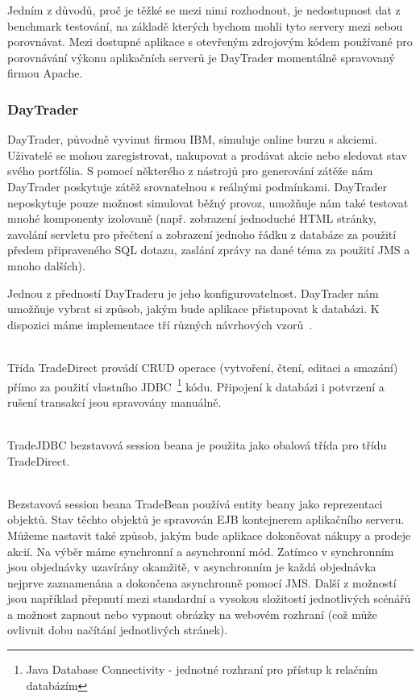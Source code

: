 \documentclass[122pt,oneside]{fithesis}
\begin{document}
Jedním z důvodů, proč je těžké se mezi nimi rozhodnout, je nedostupnost dat z benchmark testování, na základě kterých bychom mohli tyto servery mezi sebou porovnávat. Mezi dostupné aplikace s otevřeným zdrojovým kódem používané pro porovnávání výkonu aplikačních serverů je DayTrader momentálně spravovaný firmou Apache. 

\subsubsection{DayTrader}
DayTrader, původně vyvinut firmou IBM, simuluje online burzu s akciemi. Uživatelé se mohou zaregistrovat, nakupovat a prodávat akcie nebo sledovat stav svého portfólia. S pomocí některého z nástrojů pro generování zátěže nám DayTrader poskytuje zátěž srovnatelnou s reálnými podmínkami. DayTrader neposkytuje pouze možnost simulovat běžný provoz, umožňuje nám také testovat mnohé komponenty izolovaně (např. zobrazení jednoduché HTML stránky, zavolání servletu pro přečtení a zobrazení jednoho řádku z databáze za použití předem připraveného SQL dotazu, zaslání zprávy na dané téma za použití JMS a mnoho dalších). 

Jednou z předností DayTraderu je jeho konfigurovatelnost. DayTrader nám umožňuje vybrat si způsob, jakým bude aplikace přistupovat k databázi. K dispozici máme implementace tří různých návrhových vzorů~\cite{daytrader}.

\vspace{5 mm}
\\\indent Třída TradeDirect provádí CRUD operace (vytvoření, čtení, editaci a smazání) přímo za použití vlastního JDBC~\footnote{Java Database Connectivity - jednotné rozhraní pro přístup k relačním databázím} kódu. Připojení k databázi i potvrzení a rušení transakcí jsou spravovány manuálně.

\vspace{5 mm}
\\\indent TradeJDBC bezstavová session beana je použita jako obalová třída pro třídu TradeDirect.

\vspace{5 mm}
\\\indent Bezstavová session beana TradeBean používá entity beany jako reprezentaci objektů. Stav těchto objektů je spravován EJB kontejnerem aplikačního serveru.
\newline
\\\indent Můžeme nastavit také způsob, jakým bude aplikace dokončovat nákupy a prodeje akcií. Na výběr máme synchronní a asynchronní mód. Zatímco v synchronním jsou objednávky uzavírány okamžitě, v asynchronním je každá objednávka nejprve zaznamenána a dokončena asynchronně pomocí JMS. Další z možností jsou například přepnutí mezi standardní a vysokou složitostí jednotlivých scénářů a možnost zapnout nebo vypnout obrázky na webovém rozhraní (což může ovlivnit dobu načítání jednotlivých stránek).
\end{document}
